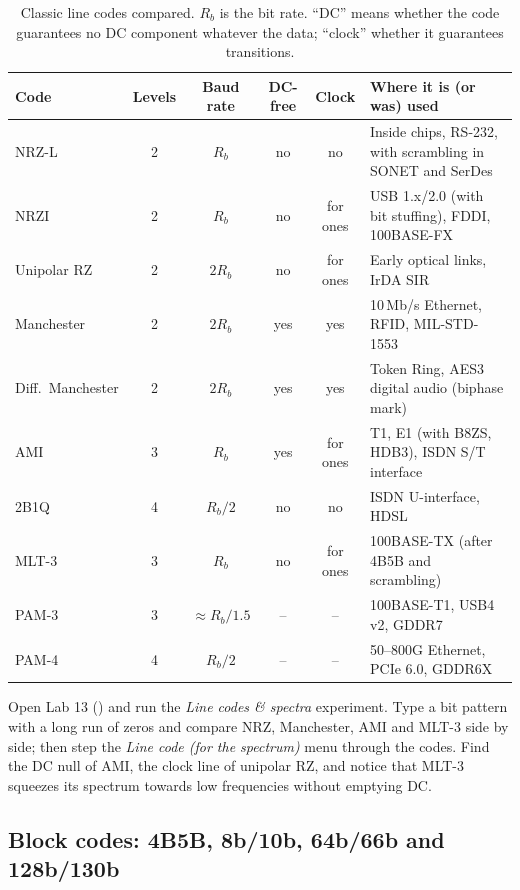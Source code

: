 \begin{table}[htbp]\centering\small
\caption{Classic line codes compared. $R_b$ is the bit rate. ``DC'' means whether the code
guarantees no DC component whatever the data; ``clock'' whether it guarantees transitions.}
\label{tab:ch08:linecodes}
\begin{tabularx}{\linewidth}{@{}l c c c c X@{}}
\toprule
Code & Levels & Baud rate & DC-free & Clock & Where it is (or was) used\\
\midrule
NRZ-L & 2 & $R_b$ & no & no & Inside chips, RS-232, with scrambling in SONET and SerDes\\
NRZI & 2 & $R_b$ & no & for ones & USB 1.x/2.0 (with bit stuffing), FDDI, 100BASE-FX\\
Unipolar RZ & 2 & $2R_b$ & no & for ones & Early optical links, IrDA SIR\\
Manchester & 2 & $2R_b$ & yes & yes & 10\,Mb/s Ethernet, RFID, MIL-STD-1553\\
Diff.\ Manchester & 2 & $2R_b$ & yes & yes & Token Ring, AES3 digital audio (biphase mark)\\
AMI & 3 & $R_b$ & yes & for ones & T1, E1 (with B8ZS, HDB3), ISDN S/T interface\\
2B1Q & 4 & $R_b/2$ & no & no & ISDN U-interface, HDSL\\
MLT-3 & 3 & $R_b$ & no & for ones & 100BASE-TX (after 4B5B and scrambling)\\
PAM-3 & 3 & $\approx R_b/1.5$ & -- & -- & 100BASE-T1, USB4 v2, GDDR7\\
PAM-4 & 4 & $R_b/2$ & -- & -- & 50--800G Ethernet, PCIe 6.0, GDDR6X\\
\bottomrule
\end{tabularx}
\end{table}

\begin{tryit}
Open Lab 13 () and run the \emph{Line codes \& spectra}
experiment. Type a bit pattern with a long run of zeros and compare NRZ, Manchester, AMI and
MLT-3 side by side; then step the \emph{Line code (for the spectrum)} menu through the codes. Find
the DC null of AMI, the clock line of unipolar RZ, and notice that MLT-3 squeezes its spectrum
towards low frequencies without emptying DC.
\end{tryit}

\subsection{Block codes: 4B5B, 8b/10b, 64b/66b and 128b/130b}

